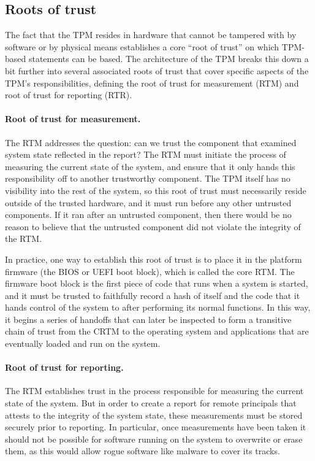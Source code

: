 \documentclass[11pt]{article}
\begin{document}
\subsection{Roots of trust}

The fact that the TPM resides in hardware that cannot be tampered with by software or by physical means establishes a core ``root of trust'' on which TPM-based statements can be based. The architecture of the TPM breaks this down a bit further into several associated roots of trust that cover specific aspects of the TPM's responsibilities, defining the root of trust for measurement (RTM) and root of trust for reporting (RTR).

\paragraph{Root of trust for measurement.} The RTM addresses the question: can we trust the component that examined system state reflected in the report? The RTM must initiate the process of measuring the current state of the system, and ensure that it only hands this responsibility off to another trustworthy component. The TPM itself has no visibility into the rest of the system, so this root of trust must necessarily reside outside of the trusted hardware, and it must run before any other untrusted components. If it ran after an untrusted component, then there would be no reason to believe that the untrusted component did not violate the integrity of the RTM.

In practice, one way to establish this root of trust is to place it in the platform firmware (the BIOS or UEFI boot block), which is called the core RTM. The firmware boot block is the first piece of code that runs when a system is started, and it must be trusted to faithfully record a hash of itself and the code that it hands control of the system to after performing its normal functions. In this way, it begins a series of handoffs that can later be inspected to form a transitive chain of trust from the CRTM to the operating system and applications that are eventually loaded and run on the system.

\paragraph{Root of trust for reporting.} The RTM establishes trust in the process responsible for measuring the current state of the system. But in order to create a report for remote principals that attests to the integrity of the system state, these measurements must be stored securely prior to reporting. In particular, once measurements have been taken it should not be possible for software running on the system to overwrite or erase them, as this would allow rogue software like malware to cover its tracks.
\end{document}
